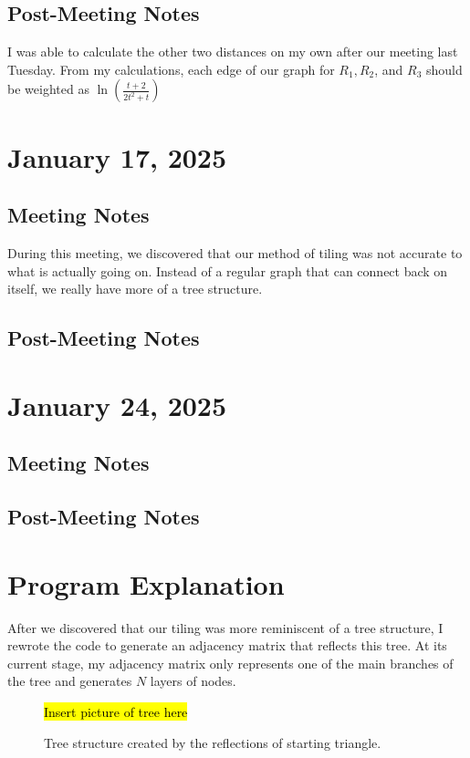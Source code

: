 \documentclass{amsart}
\begin{document}
\subsection{Post-Meeting Notes}

I was able to calculate the other two distances on my own after our meeting last Tuesday. From my calculations, each edge of our graph for $R_1, R_2$, and $R_3$ should be weighted as $\ln \left( \frac{t+2}{2t^2 + t}\right)$

\section{January 17, 2025}
\subsection{Meeting Notes}
During this meeting, we discovered that our method of tiling was not accurate to what is actually going on. Instead of a regular graph that can connect back on itself, we really have more of a tree structure. 
\subsection{Post-Meeting Notes}

\section{January 24, 2025}

\subsection{Meeting Notes}

\subsection{Post-Meeting Notes}

\section{Program Explanation}

After we discovered that our tiling was more reminiscent of a tree structure, I rewrote the code to generate an adjacency matrix that reflects this tree. At its current stage, my adjacency matrix only represents one of the main branches of the tree and generates $N$ layers of nodes.

\begin{figure}
	\hl{Insert picture of tree here}
	\label{fig:tree_structure}
	\caption{Tree structure created by the reflections of starting triangle.}
\end{figure}
\end{document}
